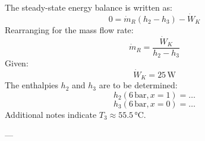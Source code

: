 The steady-state energy balance is written as:  
\[
0 = \dot{m}_R \left( h_2 - h_3 \right) - \dot{W}_K
\]  
Rearranging for the mass flow rate:  
\[
\dot{m}_R = \frac{\dot{W}_K}{h_2 - h_3}
\]  
Given:  
\[
\dot{W}_K = 25 \, \text{W}
\]  
The enthalpies \( h_2 \) and \( h_3 \) are to be determined:  
\[
h_2 (6 \, \text{bar}, x = 1) = \ldots  
\]  
\[
h_3 (6 \, \text{bar}, x = 0) = \ldots  
\]  
Additional notes indicate \( T_3 \approx 55.5 \, \text{°C} \).

---